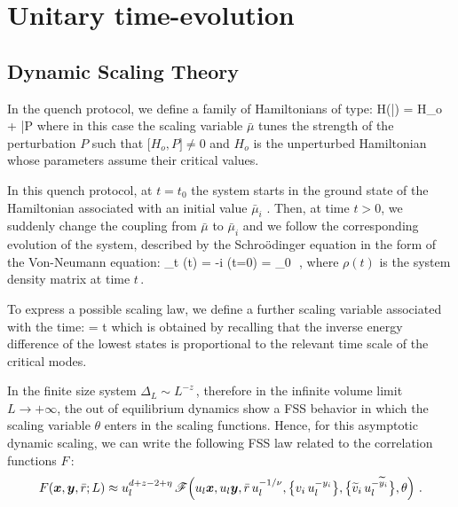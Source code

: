 \section{Unitary time-evolution}



\subsection{Dynamic Scaling Theory}

In the quench protocol, we define a family of Hamiltonians of type:
H(\bar \mu) = H_o + \bar\mu P \cm
\ea
where in this case the scaling variable $\bar \mu$ tunes the strength of the perturbation
$P$ such that $\Bigr[ H_o , P] \neq 0$ and $H_o$ is the unperturbed Hamiltonian 
whose parameters assume their critical values.

In this quench protocol, at $t = t_0$ the system starts in the ground state
of the Hamiltonian associated with an initial value $\bar \mu_i$ . Then, at time $t>0$, we
suddenly change the coupling from $\bar \mu$ to $\bar \mu _i$ and we follow the 
corresponding evolution of the system, described by the Schro\"odinger equation
in the form of the Von-Neumann equation:
\partial_t \rho(t) = -i  \qquad \rho(t=0) = \rho_0 \,\,,
\ea
where $\rho(t)$ is the system density matrix at time $t\,$.

To express a possible scaling law, we define a further scaling variable associated
with the time:
\theta = t \Delta \cm
\ee
which is obtained by recalling that the inverse energy difference of the lowest states
is proportional to the relevant time scale of the critical modes.

$ $\\

In the finite size system $\Delta _L \sim L^{-z}\,$, therefore in the infinite volume limit $L\to +\infty$, the out of equilibrium dynamics show a FSS behavior in which the scaling variable $\theta$ enters in the scaling functions. Hence, for this asymptotic dynamic scaling, we can write the following FSS law related to the correlation functions $F\,$: 
\begin{equation}  
\label{dfss-C}
F(\bm x, \bm y, \bar r;L) \approx u_l^{d+z-2+\eta} \,\mathscr{F}\Bigl(u_l\bm x ,u_l\bm y, \bar r\,u_l^{-1/\nu}, \bigl\{v_i\,u_l^{-y_i}\bigl\},  \bigl\{\widetilde{v}_i\,u_l^{-\widetilde{y}_i}\bigl\}, \theta  \Bigl) \,\,.
\end{equation}

